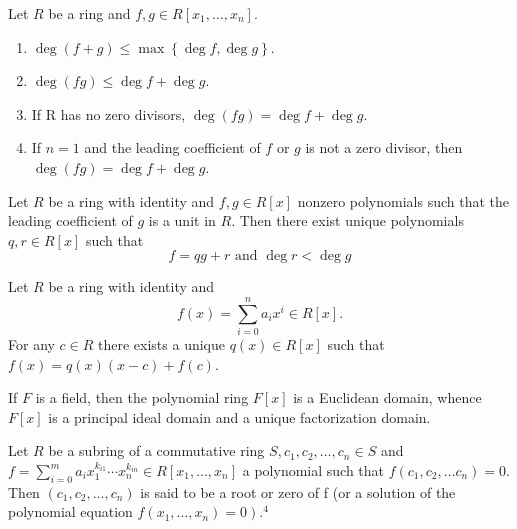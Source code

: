 \begin{theorem}
    Let $R$ be a ring and $f, g \in R\left[x_1, \ldots, x_{n}\right]$.
    \begin{enumerate}
        \item
              $\operatorname{deg}\left(f+g\right) \leq \max \left\{\operatorname{deg} f, \operatorname{deg} g\right\}$.
        \item
              $\operatorname{deg}(fg) \leq \operatorname{deg} f+\operatorname{deg} g$.
        \item
              If R has no zero divisors, $\operatorname{deg}(fg)=\operatorname{deg} f+\operatorname{deg} g$.
        \item
              If $n=1$ and the leading coefficient of $f$ or $g$ is not a zero divisor, then $\operatorname{deg}(fg)=\operatorname{deg} f+\operatorname{deg} g$.
    \end{enumerate}
\end{theorem}

\begin{theorem}
    Let $R$ be a ring with identity and $f, g \in R[x]$ nonzero polynomials such that the leading coefficient of $g$ is a unit in $R$.
    Then there exist unique polynomials $q, r \in R[x]$ such that
    \begin{equation*}
        f=qg+r \text { and } \operatorname{deg} r<\operatorname{deg} g
    \end{equation*}
\end{theorem}

\begin{corollary}
    Let $R$ be a ring with identity and
    \begin{equation*}
        f(x)=\sum_{i=0}^n a_{i} x^{i} \in R[x] .
    \end{equation*}
    For any $c \in R$ there exists a unique $q(x) \in R[x]$ such that $f(x)=q(x)(x-c)+f(c)$.
\end{corollary}
\begin{corollary}
    If $F$ is a field, then the polynomial ring $F[x]$ is a Euclidean domain, whence $F[x]$ is a principal ideal domain and a unique factorization domain.
\end{corollary}

\begin{definition}
    Let $R$ be a subring of a commutative ring $S, c_1, c_2, \ldots, c_{n} \in S$ and $f=\sum_{i=0}^m a_i x_1^{k_{i 1}} \cdots x_n^{k_{i n}} \in R\left[x_1, \ldots, x_{n}\right]$ a polynomial such that $f\left(c_1, c_2, \ldots c_{n}\right)=0$. Then $\left(c_1, c_2, \ldots, c_{n}\right)$ is said to be a root or zero of f (or a solution of the polynomial equation $\left.f\left(x_1, \ldots, x_{n}\right)=0\right) .^4$


\end{definition}

